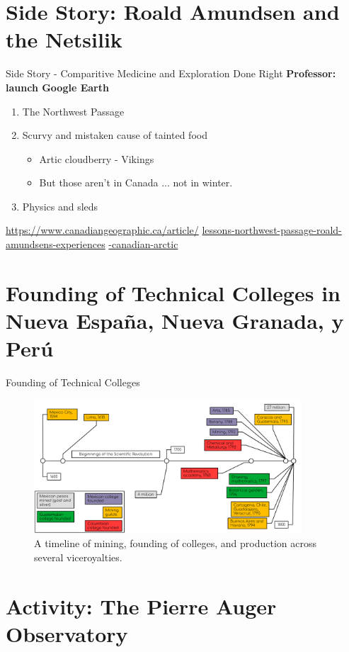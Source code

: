 \documentclass{beamer}
\begin{document}
\section{Side Story: Roald Amundsen and the Netsilik}

\begin{frame}{Side Story - Comparitive Medicine and Exploration Done Right}
\small
\textbf{Professor: launch Google Earth}
\begin{enumerate}
\item The Northwest Passage
\item Scurvy and mistaken cause of tainted food
\begin{itemize}
\item Artic cloudberry - Vikings
\item But those aren't in Canada ... not in winter.
\end{itemize}
\item Physics and sleds
\end{enumerate}
\url{https://www.canadiangeographic.ca/article/}
\url{lessons-northwest-passage-roald-amundsens-experiences}
\url{-canadian-arctic}
\end{frame}

\section{Founding of Technical Colleges in Nueva Espa\~{n}a, Nueva Granada, y Per\'{u}}

\begin{frame}{Founding of Technical Colleges}
\begin{figure}
\includegraphics[width=10cm]{figures/Timeline.pdf}
\caption{\label{fig:timeline} A timeline of mining, founding of colleges, and production across several viceroyalties.}
\end{figure}
\end{frame}

\section{Activity: The Pierre Auger Observatory}
\end{document}
